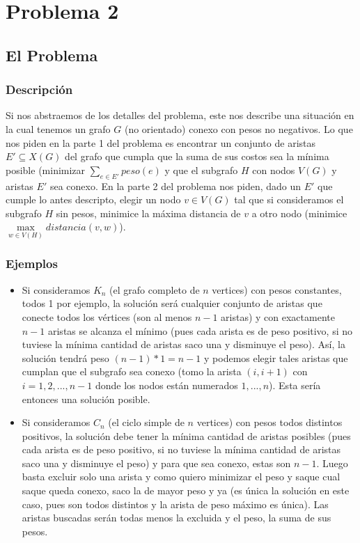 \documentclass[A4paper,oneside,fleqn,11pt]{article}
\theoremstyle{definition}
\begin{document}
\section{Problema 2}
\subsection{El Problema}

\subsubsection{Descripción}
Si nos abstraemos de los detalles del problema, este nos describe una situación en la cual tenemos un grafo $G$ (no orientado) conexo con pesos no negativos. Lo que nos piden en la parte 1 del problema es encontrar un conjunto de aristas $E' \subseteq X(G)$ del grafo que cumpla que la suma de sus costos sea la mínima posible (minimizar $\sum\limits_{e \in E'} {peso(e)}$ y que el subgrafo $H$ con nodos $V(G)$ y aristas $E'$ sea conexo. En la parte 2
del problema nos piden, dado un $E'$ que cumple lo antes descripto, elegir un nodo $v \in V(G)$ tal que si consideramos el subgrafo $H$ sin pesos, minimice la máxima distancia de $v$ a otro nodo (minimice $\max\limits_{w\in V(H)}{distancia(v,w)}$).

\subsubsection{Ejemplos}
\begin{itemize}

\item Si consideramos $K_{n}$  (el grafo completo de $n$ vertices) con pesos constantes, todos 1 por ejemplo, la solución será cualquier conjunto de aristas que conecte todos los vértices (son al menos $n-1$ aristas) y con exactamente $n-1$ aristas se alcanza el mínimo (pues cada arista es de peso positivo, si no tuviese la mínima cantidad de aristas saco una y disminuye el peso). Así, la solución tendrá peso $(n-1)*1=n-1$ y podemos elegir tales aristas que cumplan que el subgrafo sea conexo (tomo la arista $(i,i+1)$ con $i=1,2,...,n-1$ donde los nodos están numerados $1,...,n$). Esta sería entonces una solución posible.
\item Si consideramos $C_{n}$ (el ciclo simple de $n$ vertices) con pesos todos distintos positivos, la solución debe tener la mínima cantidad de aristas posibles (pues cada arista es de peso positivo, si no tuviese la mínima cantidad de aristas saco una y disminuye el peso) y para que sea conexo, estas son $n-1$. Luego basta excluir solo una arista y como quiero minimizar el peso y saque cual saque queda conexo, saco la de mayor peso y ya (es única la solución en este caso, pues son todos distintos y la arista de peso máximo es única). Las aristas buscadas serán todas menos la excluida y el peso, la suma de sus pesos.

\end{itemize}
\end{document}
